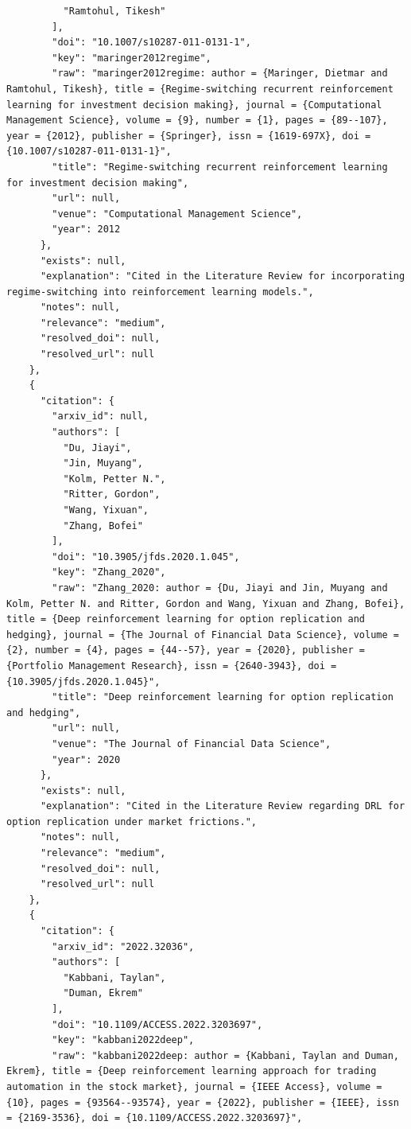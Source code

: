 \documentclass[11pt]{article}
\begin{document}
\begin{verbatim}
          "Ramtohul, Tikesh"
        ],
        "doi": "10.1007/s10287-011-0131-1",
        "key": "maringer2012regime",
        "raw": "maringer2012regime: author = {Maringer, Dietmar and Ramtohul, Tikesh}, title = {Regime-switching recurrent reinforcement learning for investment decision making}, journal = {Computational Management Science}, volume = {9}, number = {1}, pages = {89--107}, year = {2012}, publisher = {Springer}, issn = {1619-697X}, doi = {10.1007/s10287-011-0131-1}",
        "title": "Regime-switching recurrent reinforcement learning for investment decision making",
        "url": null,
        "venue": "Computational Management Science",
        "year": 2012
      },
      "exists": null,
      "explanation": "Cited in the Literature Review for incorporating regime-switching into reinforcement learning models.",
      "notes": null,
      "relevance": "medium",
      "resolved_doi": null,
      "resolved_url": null
    },
    {
      "citation": {
        "arxiv_id": null,
        "authors": [
          "Du, Jiayi",
          "Jin, Muyang",
          "Kolm, Petter N.",
          "Ritter, Gordon",
          "Wang, Yixuan",
          "Zhang, Bofei"
        ],
        "doi": "10.3905/jfds.2020.1.045",
        "key": "Zhang_2020",
        "raw": "Zhang_2020: author = {Du, Jiayi and Jin, Muyang and Kolm, Petter N. and Ritter, Gordon and Wang, Yixuan and Zhang, Bofei}, title = {Deep reinforcement learning for option replication and hedging}, journal = {The Journal of Financial Data Science}, volume = {2}, number = {4}, pages = {44--57}, year = {2020}, publisher = {Portfolio Management Research}, issn = {2640-3943}, doi = {10.3905/jfds.2020.1.045}",
        "title": "Deep reinforcement learning for option replication and hedging",
        "url": null,
        "venue": "The Journal of Financial Data Science",
        "year": 2020
      },
      "exists": null,
      "explanation": "Cited in the Literature Review regarding DRL for option replication under market frictions.",
      "notes": null,
      "relevance": "medium",
      "resolved_doi": null,
      "resolved_url": null
    },
    {
      "citation": {
        "arxiv_id": "2022.32036",
        "authors": [
          "Kabbani, Taylan",
          "Duman, Ekrem"
        ],
        "doi": "10.1109/ACCESS.2022.3203697",
        "key": "kabbani2022deep",
        "raw": "kabbani2022deep: author = {Kabbani, Taylan and Duman, Ekrem}, title = {Deep reinforcement learning approach for trading automation in the stock market}, journal = {IEEE Access}, volume = {10}, pages = {93564--93574}, year = {2022}, publisher = {IEEE}, issn = {2169-3536}, doi = {10.1109/ACCESS.2022.3203697}",

\end{verbatim}
\end{document}
